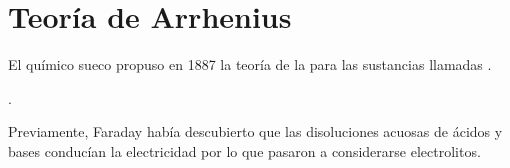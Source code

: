 %

\section{Teoría de Arrhenius}
El químico sueco  propuso en \num{1887} la teoría de la  para las sustancias llamadas .

.

Previamente, Faraday había descubierto que las disoluciones acuosas de ácidos y bases conducían la electricidad por lo que pasaron a considerarse electrolitos.


